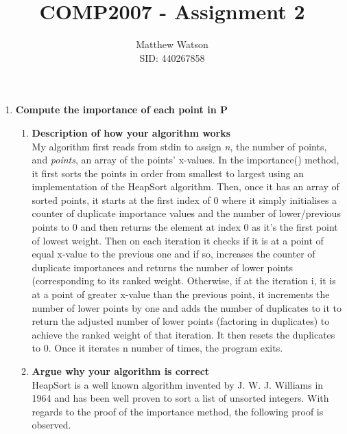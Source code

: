 \documentclass[11pt, oneside]{article}   	%
\title{COMP2007 - Assignment 2}
\author{Matthew Watson\\ SID: 440267858}
\date{}							%
\begin{document}
\maketitle

\begin{enumerate}
	\item \textbf{Compute the importance of each point in P}
	\begin{enumerate}
		\item \textbf{Description of how your algorithm works}\\
		My algorithm first reads from stdin to assign \textit{n}, the number of points, and \textit{points}, an array of the points' x-values. In the importance() method, it first sorts the points in order from smallest to largest using an implementation of the HeapSort algorithm. Then, once it has an array of sorted points, it starts at the first index of 0 where it simply initialises a counter of duplicate importance values and the number of lower/previous points to 0 and then returns the element at index 0 as it's the first point of lowest weight. Then on each iteration it checks if it is at a point of equal x-value to the previous one and if so, increases the counter of duplicate importances and returns the number of lower points (corresponding to its ranked weight. Otherwise, if at the iteration i, it is at a point of greater x-value than the previous point, it increments the number of lower points by one and adds the number of duplicates to it to return the adjusted number of lower points (factoring in duplicates) to achieve the ranked weight of that iteration. It then resets the duplicates to 0. Once it iterates n number of times, the program exits.
		\item \textbf{Argue why your algorithm is correct}\\
		HeapSort is a well known algorithm invented by J. W. J. Williams in 1964 and has been well proven to sort a list of unsorted integers. With regards to the proof of the importance method, the following proof is observed.\\

\end{enumerate}
\end{enumerate}
\end{document}
